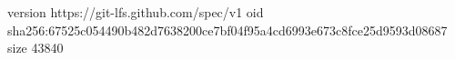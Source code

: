 version https://git-lfs.github.com/spec/v1
oid sha256:67525c054490b482d7638200ce7bf04f95a4cd6993e673c8fce25d9593d08687
size 43840
